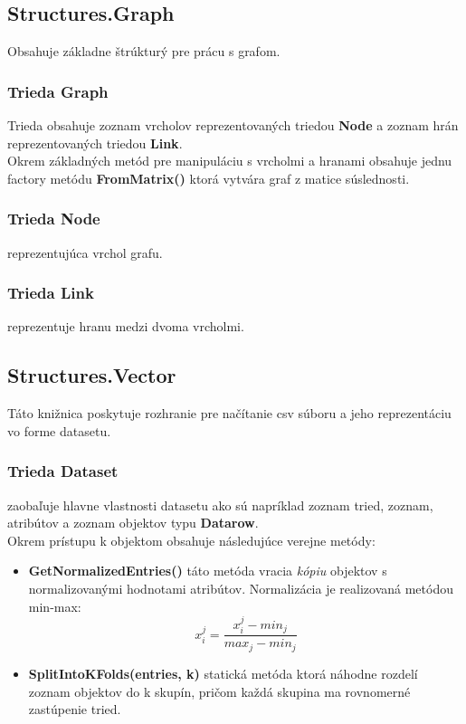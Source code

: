 \documentclass[slovak,master,dept460,male,cpp,cpdeclaration]{diploma}
\begin{document}
\subsection{Structures.Graph}
Obsahuje základne štrúkturý pre prácu s grafom.
\subsubsection{Trieda Graph}
Trieda obsahuje zoznam vrcholov reprezentovaných triedou \textbf{Node} a zoznam hrán reprezentovaných triedou \textbf{Link}. \\
Okrem základných metód pre manipuláciu s vrcholmi a hranami obsahuje jednu factory metódu \textbf{FromMatrix()} ktorá vytvára graf z matice súslednosti.
\subsubsection{Trieda Node} reprezentujúca vrchol grafu.
\subsubsection{Trieda Link} reprezentuje hranu medzi dvoma vrcholmi.

\subsection{Structures.Vector}
Táto knižnica poskytuje rozhranie pre načítanie csv súboru a jeho reprezentáciu vo forme datasetu.
\subsubsection{Trieda Dataset} zaobaľuje hlavne vlastnosti datasetu ako sú napríklad zoznam tried, zoznam, atribútov a zoznam objektov typu \textbf{Datarow}. \\
Okrem prístupu k objektom obsahuje následujúce verejne metódy:
\begin{itemize}
\item \textbf{GetNormalizedEntries()} táto metóda vracia \textit{kópiu} objektov s normalizovanými hodnotami atribútov. Normalizácia je realizovaná  metódou min-max:
\begin{equation}
	x_i^j=\frac{x_i^j-min_j}{max_j - min_j}
\end{equation}
\item \textbf{SplitIntoKFolds(entries, k)} statická metóda ktorá náhodne rozdelí zoznam objektov do k skupín, pričom každá skupina ma rovnomerné zastúpenie tried.
\end{itemize}
\end{document}
